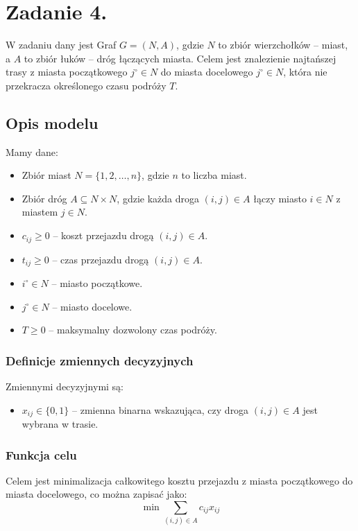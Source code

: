 \documentclass[11pt,a4paper]{article}
\numberwithin{equation}{section}
\begin{document}
\section{Zadanie 4.}
W zadaniu dany jest Graf $G=(N,A)$, gdzie $N$ to zbiór wierzchołków -- miast, a $A$ to zbiór łuków -- dróg łączących miasta. Celem jest znalezienie najtańszej trasy z miasta początkowego $j^{\circ} \in N$ do miasta docelowego $j^{\circ} \in N$, która nie przekracza określonego czasu podróży $T$.
\subsection{Opis modelu}
Mamy dane:
\begin{itemize}
    \item Zbiór miast $N = \{1, 2, \ldots, n\}$, gdzie $n$ to liczba miast.
    \item Zbiór dróg $A \subseteq N \times N$, gdzie każda droga $(i,j) \in A$ łączy miasto $i \in N$ z miastem $j \in N$.
    \item $c_{ij} \geq 0$ -- koszt przejazdu drogą $(i,j) \in A$.
    \item $t_{ij} \geq 0$ -- czas przejazdu drogą $(i,j) \in A$.
    \item $i^{\circ} \in N$ -- miasto początkowe.
    \item $j^{\circ} \in N$ -- miasto docelowe.
    \item $T \geq 0$ -- maksymalny dozwolony czas podróży.
\end{itemize}

\subsubsection{Definicje zmiennych decyzyjnych}
Zmiennymi decyzyjnymi są:
\begin{itemize}
    \item $x_{ij} \in \{0,1\}$ -- zmienna binarna wskazująca, czy droga $(i,j) \in A$ jest wybrana w trasie.
\end{itemize}
\subsubsection{Funkcja celu}
Celem jest minimalizacja całkowitego kosztu przejazdu z miasta początkowego do miasta docelowego, co można zapisać jako:
\[
    \min \sum_{(i,j) \in A} c_{ij} x_{ij}
\]
\end{document}
